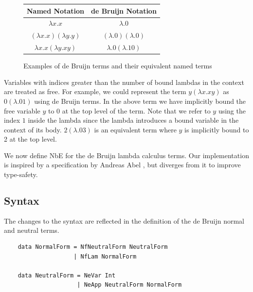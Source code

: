 \begin{figure}[h]
    \centering
    \begin{tabular}{ |c|c| } 
        \hline
        Named Notation & de Bruijn Notation \\
        \hline 
        $\lambda x.x$ & $\lambda . 0$ \\
        $(\lambda x. x)(\lambda y . y)$ & $(\lambda . 0)(\lambda . 0)$ \\
        $\lambda x. x (\lambda y. x y)$ & $\lambda . 0 (\lambda . 1 0 )$ \\
        \hline
    \end{tabular}
    \caption{Examples of de Bruijn terms and their equivalent named terms}
    \label{fig:deBruijnExamples}
\end{figure}




Variables with indices greater than the number of bound lambdas in the context are treated as free. For example, we could represent the term $y (\lambda x.xy)$ as $0 (\lambda .01)$ using de Bruijn terms. In the above term we have implicitly bound the free variable $y$ to 0 at the top level of the term. Note that we refer to $y$ using the index $1$ inside the lambda since the lambda introduces a bound variable in the context of its body. $2(\lambda . 0 3)$ is an equivalent term where $y$ is implicitly bound to 2 at the top level.

We now define NbE for the de Bruijn lambda calculus terms. Our implementation is inspired by a specification by Andreas Abel \cite{deBruijn}, but diverges from it to improve type-safety.

\subsection{Syntax}

The changes to the syntax are reflected in the definition of the de Bruijn normal and neutral terms. 

\begin{lstlisting}
    data NormalForm = NfNeutralForm NeutralForm
                    | NfLam NormalForm

    data NeutralForm = NeVar Int
                     | NeApp NeutralForm NormalForm
\end{lstlisting}

